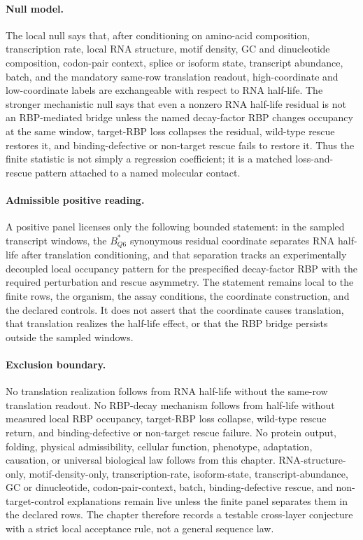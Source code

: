 \paragraph{Null model.}
The local null says that, after conditioning on amino-acid composition, transcription rate, local RNA structure, motif density, GC and dinucleotide composition, codon-pair context, splice or isoform state, transcript abundance, batch, and the mandatory same-row translation readout, high-coordinate and low-coordinate labels are exchangeable with respect to RNA half-life.  The stronger mechanistic null says that even a nonzero RNA half-life residual is not an RBP-mediated bridge unless the named decay-factor RBP changes occupancy at the same window, target-RBP loss collapses the residual, wild-type rescue restores it, and binding-defective or non-target rescue fails to restore it.  Thus the finite statistic is not simply a regression coefficient; it is a matched loss-and-rescue pattern attached to a named molecular contact.

\paragraph{Admissible positive reading.}
A positive panel licenses only the following bounded statement: in the sampled transcript windows, the $B^{*}_{Q6}$ synonymous residual coordinate separates RNA half-life after translation conditioning, and that separation tracks an experimentally decoupled local occupancy pattern for the prespecified decay-factor RBP with the required perturbation and rescue asymmetry.  The statement remains local to the finite rows, the organism, the assay conditions, the coordinate construction, and the declared controls.  It does not assert that the coordinate causes translation, that translation realizes the half-life effect, or that the RBP bridge persists outside the sampled windows.

\paragraph{Exclusion boundary.}
No translation realization follows from RNA half-life without the same-row translation readout.  No RBP-decay mechanism follows from half-life without measured local RBP occupancy, target-RBP loss collapse, wild-type rescue return, and binding-defective or non-target rescue failure.  No protein output, folding, physical admissibility, cellular function, phenotype, adaptation, causation, or universal biological law follows from this chapter.  RNA-structure-only, motif-density-only, transcription-rate, isoform-state, transcript-abundance, GC or dinucleotide, codon-pair-context, batch, binding-defective rescue, and non-target-control explanations remain live unless the finite panel separates them in the declared rows.  The chapter therefore records a testable cross-layer conjecture with a strict local acceptance rule, not a general sequence law.

